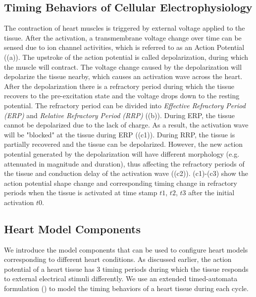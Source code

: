 \subsection{Timing Behaviors of Cellular Electrophysiology}
The contraction of heart muscles is triggered by external voltage applied to the tissue. After the activation, a transmembrane voltage change over time can be sensed due to ion channel activities, which is referred to as an Action Potential ((a)). The upstroke of the action potential is called depolarization, during which the muscle will contract. The voltage change caused by the depolarization will depolarize the tissue nearby, which causes an activation wave across the heart. After the depolarization there is a refractory period during which the tissue recovers to the pre-excitation state and the voltage drops down to the resting potential. The refractory period can be divided into \emph{Effective Refractory Period (ERP)} and \emph{Relative Refractory Period (RRP)} ((b)). During ERP, the tissue cannot be depolarized due to the lack of charge. As a result, the activation wave will be "blocked" at the tissue during ERP ((c1)). During RRP, the tissue is partially recovered and the tissue can be depolarized. However, the new action potential generated by the depolarization will have different morphology (e.g. attenuated in magnitude and duration), thus affecting the refractory periods of the tissue and conduction delay of the activation wave ((c2)). (c1)-(c3) show the action potential shape change and corresponding timing change in refractory periods when the tissue is activated at time stamp $t1$, $t2$, $t3$ after the initial activation $t0$. 

\subsection{Heart Model Components}
We introduce the model components that can be used to configure heart models corresponding to different heart conditions. As discussed earlier, the action potential of a heart tissue has 3 timing periods during which the tissue responds to external electrical stimuli differently. We use an extended timed-automata formulation (\cite{timed_automata}) to model the timing behaviors of a heart tissue during each cycle. 

